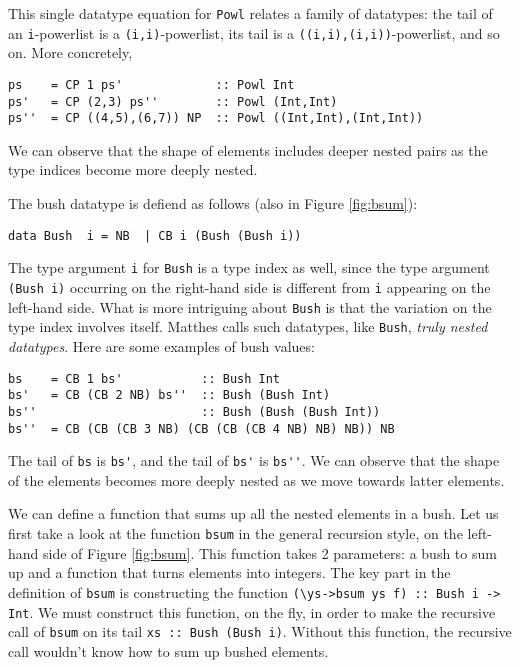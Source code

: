 \documentclass[letterpaper,12pt]{article}
\begin{document}
This single datatype equation for \verb|Powl| relates a family of datatypes:
the tail of an \verb|i|-powerlist is a \verb|(i,i)|-powerlist,
its tail is a \verb|((i,i),(i,i))|-powerlist, and so on.
More concretely,
\begin{verbatim}
ps    = CP 1 ps'             :: Powl Int
ps'   = CP (2,3) ps''        :: Powl (Int,Int)
ps''  = CP ((4,5),(6,7)) NP  :: Powl ((Int,Int),(Int,Int))
\end{verbatim}
We can observe that the shape of elements includes deeper nested pairs
as the type indices become more deeply nested.

The bush datatype is defiend as follows (also in Figure \ref{fig:bsum}):
\begin{verbatim}
data Bush  i = NB  | CB i (Bush (Bush i))
\end{verbatim}
The type argument \verb|i| for \verb|Bush| is a type index as well, since
the type argument \verb|(Bush i)| occurring on the right-hand side is
different from \verb|i| appearing on the left-hand side.  What is more intriguing
about \verb|Bush| is that the variation on the type index involves itself.
Matthes\cite{Mat09} calls such datatypes, like \verb|Bush|,
\emph{truly nested datatypes}.
Here are some examples of bush values:
\begin{verbatim}
bs    = CB 1 bs'           :: Bush Int
bs'   = CB (CB 2 NB) bs''  :: Bush (Bush Int)
bs''                       :: Bush (Bush (Bush Int))
bs''  = CB (CB (CB 3 NB) (CB (CB (CB 4 NB) NB) NB)) NB
\end{verbatim}
The tail of \verb|bs| is \verb|bs'|, and the tail of \verb|bs'| is \verb|bs''|.
We can observe that the shape of the elements becomes more deeply nested as we
move towards latter elements.

We can define a function that sums up all the nested elements in a bush.
Let us first take a look at the function \verb|bsum| in the general recursion style,
on the left-hand side of Figure \ref{fig:bsum}.
This function takes 2 parameters: a bush to sum up and a function that
turns elements into integers.  The key part in the definition of \verb|bsum| is
constructing the function \verb|(\ys->bsum ys f) :: Bush i -> Int|.  We must
construct this function, on the fly, in order to make the recursive call of
\verb|bsum| on its tail \verb|xs :: Bush (Bush i)|.  Without this function,
the recursive call wouldn't know how to sum up bushed elements.
\end{document}
